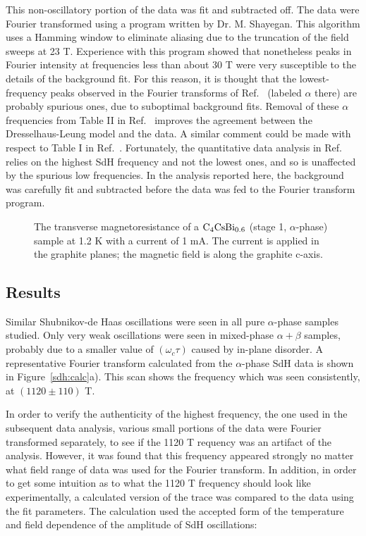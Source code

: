 	This  non-oscillatory portion of  the data  was  fit and subtracted
off.  The data were Fourier transformed using a program  written by Dr.  M.
Shayegan.  This algorithm uses a Hamming window  to eliminate  aliasing due
to the truncation of  the  field  sweeps at  23  T.  Experience  with  this
program showed that nonetheless  peaks in Fourier intensity at  frequencies
less than about 30 T were very susceptible to the details of the background
fit.  For  this  reason, it is  thought  that  the  lowest-frequency  peaks
observed in the Fourier transforms  of  Ref.~\cite{Z260}  (labeled $\alpha$
there)   are probably  spurious ones,  due  to  suboptimal background fits.
Removal  of these $\alpha$  frequencies   from Table II in Ref.~\cite{Z260}
improves  the  agreement between the Dresselhaus-Leung  model\cite{F60} and
the data.   A similar comment  could  be made   with respect to Table I  in
Ref.~\cite{W179}.    Fortunately,   the  quantitative    data   analysis in
Ref.~\cite{Z260,W179}  relies on the   highest  SdH  frequency and not  the
lowest ones, and so is unaffected by the  spurious low frequencies.  In the
analysis reported  here, the background  was  carefully fit  and subtracted
before the data was fed to the Fourier transform program.

\begin{figure}
\center
{} 
\caption[Magnetoresistance of a stage 1 $\alpha$-phase CsBi-GIC, $\rm
C_4CsBi_{0.6}$]{The  transverse magnetoresistance of  a $\rm C_4CsBi_{0.6}$
(stage 1, $\alpha$-phase) sample  at 1.2 K with  a current  of  1 mA.   The
current is applied in the graphite planes; the magnetic field is  along the
graphite c-axis.}
\label{mr}
\end{figure}

\subsection{Results}
\label{sdh:results}
	
	Similar	Shubnikov-de   Haas  oscillations  were  seen  in  all pure
$\alpha$-phase samples studied.   Only very weak  oscillations were seen in
mixed-phase $\alpha + \beta$  samples, probably  due to  a smaller value of
$(\omega_c \tau)$ caused  by in-plane  disorder.  A representative  Fourier
transform   calculated  from the   $\alpha$-phase   SdH  data  is  shown in
Figure~\ref{sdh:calc}a).  This  scan shows   the frequency which   was seen
consistently, at $(1120 \pm 110)$ T.

	In order to verify the  authenticity of the highest  frequency, the
one used  in the subsequent data  analysis,  various small portions of  the
data  were   Fourier  transformed   separately, to see   if the  1120 T
requency was an artifact of the analysis.  However, it  was found that this
frequency appeared strongly no matter what field range of data was used for
the Fourier transform.  In addition, in order to  get some  intuition as to
what the 1120  T frequency should  look like  experimentally,  a calculated
version of  the trace was compared  to the  data using  the fit parameters.
The calculation  used  the accepted    form of the temperature  and   field
dependence of the amplitude of SdH oscillations:\cite{Z260}\\

